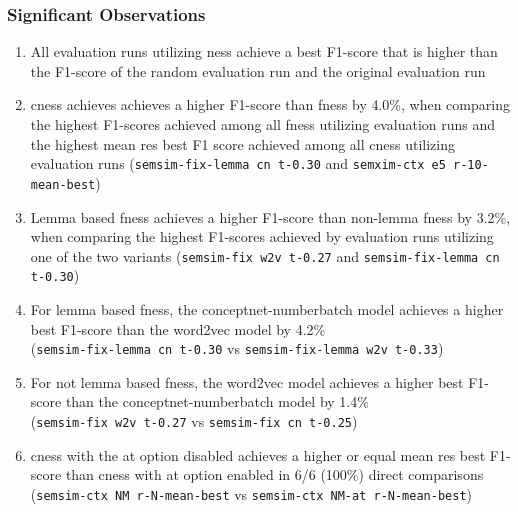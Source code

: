 \documentclass[11pt]{scrreprt}
\newcounter{listcounter}
\begin{document}
{\subsubsection{Significant Observations}
\begin{enumerate}[label=\arabic{listcounter}.\arabic*]
	\item All evaluation runs utilizing \gls{ness} achieve a best F1-score that is higher than the F1-score of the random evaluation run and the original evaluation run \label{obs-itm:ness-higher-best-f1}
	\item \gls{cness} achieves achieves a higher F1-score than \gls{fness} by 4.0\%, when comparing the highest F1-scores achieved among all \gls{fness} utilizing evaluation runs and the highest mean \gls{res} best F1 score achieved among all \gls{cness} utilizing evaluation runs (\texttt{semsim-fix-lemma cn t-0.30} and \texttt{semxim-ctx e5 r-10-mean-best}) \label{obs-itm:cness-higher-best-f1-than-fness}
	\item Lemma based \gls{fness} achieves a higher F1-score than non-lemma \gls{fness} by 3.2\%, when comparing the highest F1-scores achieved by evaluation runs utilizing one of the two variants (\texttt{semsim-fix w2v t-0.27} and \texttt{semsim-fix-lemma cn t-0.30}) \label{obs-itm:lemma-based-fness-higher-best-f1}
	\item For lemma based \gls{fness}, the conceptnet-numberbatch model achieves a higher best F1-score than the word2vec model by 4.2\% \\ (\texttt{semsim-fix-lemma cn t-0.30} vs \texttt{semsim-fix-lemma w2v t-0.33}) \label{obs-itm:lemma-fness-cn-better-than-w2v}
	\item For not lemma based \gls{fness}, the word2vec model achieves a higher best F1-score than the conceptnet-numberbatch model by 1.4\% \\ (\texttt{semsim-fix w2v t-0.27} vs \texttt{semsim-fix cn t-0.25}) \label{obs-itm:word-fness-w2v-better-than-cn}
	\item \gls{cness} with the \gls{at} option disabled achieves a higher or equal mean \gls{res} best F1-score than \gls{cness} with \gls{at} option enabled in 6/6 (100\%) direct comparisons \\(\texttt{semsim-ctx NM r-N-mean-best} vs \texttt{semsim-ctx NM-at r-N-mean-best}) \label{obs-itm:cness-better-without-AT}

\end{enumerate}}
\end{document}
